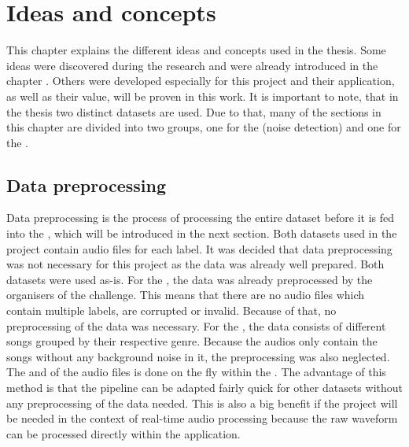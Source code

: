 \chapter{Ideas and concepts}
\label{ch:Ideas-Concepts}

This chapter explains the different ideas and concepts used in the thesis. Some ideas were discovered during the research and were already introduced in the chapter . Others were developed especially for this project and their application, as well as their value, will be proven in this work.
\newline
\newline
It is important to note, that in the thesis two distinct datasets are used. Due to that, many of the sections in this chapter are divided into two groups, one for the  (noise detection) and one for the .

\section{Data preprocessing}
\label{sec:Data-Preprocessing}
Data preprocessing is the process of processing the entire dataset before it is fed into the , which will be introduced in the next section. Both datasets used in the project contain audio files for each label. It was decided that data preprocessing was not necessary for this project as the data was already well prepared. Both datasets were used as-is.
\newline
\newline
For the , the data was already preprocessed by the organisers of the challenge. This means that there are no audio files which contain multiple labels, are corrupted or invalid. Because of that, no preprocessing of the data was necessary.
\newline
\newline
For the , the data consists of different songs grouped by their respective genre. Because the audios only contain the songs without any background noise in it, the preprocessing was also neglected.
\newline
\newline
The  and  of the audio files is done on the fly within the . The advantage of this method is that the pipeline can be adapted fairly quick for other datasets without any preprocessing of the data needed. This is also a big benefit if the project will be needed in the context of real-time audio processing because the raw waveform can be processed directly within the application.

